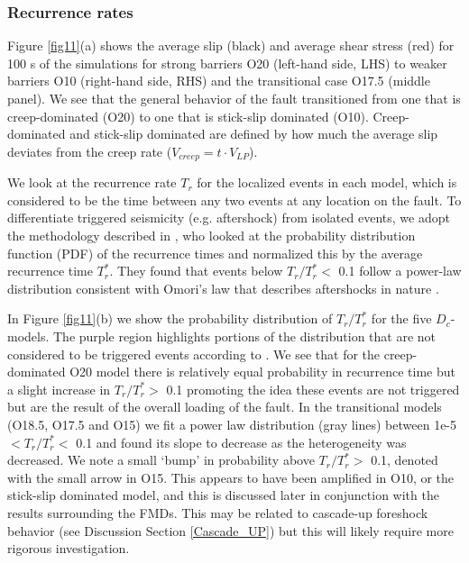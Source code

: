 \documentclass[preprint,1p, 10pt,authoryear]{elsarticle}
\begin{document}
\subsubsection{Recurrence rates}
\label{Recurrence times}
Figure \ref{fig11}(a) shows the average slip (black) and average shear stress (red) for 100 s of the simulations for strong barriers O20 (left-hand side, LHS) to weaker barriers O10 (right-hand side, RHS) and the transitional case O17.5 (middle panel).  We see that the general behavior of the fault transitioned from one that is creep-dominated (O20) to one that is stick-slip dominated (O10). Creep-dominated and stick-slip dominated are defined by how much the average slip deviates from the creep rate ($V_{creep} = t\cdot V_{LP}$). 

We look at the recurrence rate $T_{r}$ for the localized events in each model, which is considered to be the time between any two events at any location on the fault. To differentiate triggered  seismicity (e.g. aftershock) from isolated events, we adopt the methodology described in \citet{Lengline2009}, who looked at the probability distribution function (PDF) of the recurrence times and normalized this by the average recurrence time $T^{*}_{r}$.  They found that events below $T_{r}/T^{*}_{r} <$ 0.1 follow a power-law distribution consistent with Omori's law that describes aftershocks in nature \citep[e.g.,][]{Lengline2009}. 

In Figure \ref{fig11}(b) we show the probability distribution of $T_{r}/T^{*}_{r}$ for the five $D_{c}$-models. The purple region highlights portions of the distribution that are not considered to be triggered events according to \citet{Lengline2009}. We see that for the creep-dominated O20 model there is relatively equal probability in recurrence time but a slight increase in  $T_{r}/T^{*}_{r} >$ 0.1 promoting the idea these events are not triggered but are the result of the overall loading of the fault. In the transitional models (O18.5, O17.5 and O15) we fit a power law distribution (gray lines) between 1e-5 $< T_{r}/T^{*}_{r} <$ 0.1 and found its slope to decrease as the heterogeneity was decreased. We note a small `bump' in probability above $T_{r}/T^{*}_{r} >$ 0.1, denoted with the small arrow in O15. This appears to have been amplified in O10, or the stick-slip dominated model, and this is discussed later in conjunction with the results surrounding the FMDs.  This may be related to cascade-up foreshock behavior (see Discussion Section \ref{Cascade_UP}) but this will likely require more rigorous investigation.
\end{document}
